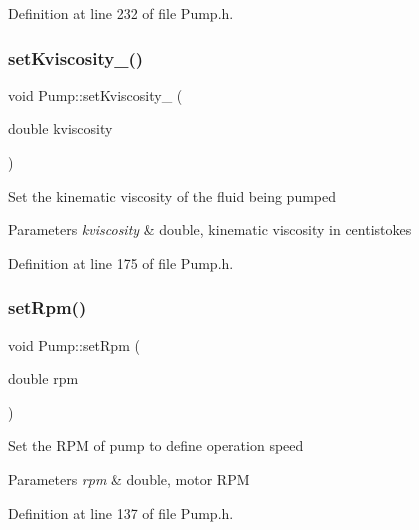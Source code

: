 Definition at line 232 of file Pump.\+h.

\mbox{\label{class_pump_a26d1d10908f91137f5148540ceb6520a}} 
\subsubsection{\texorpdfstring{set\+Kviscosity\+\_\+()}{setKviscosity\_()}}
{\footnotesize\ttfamily void Pump\+::set\+Kviscosity\+\_\+ (\begin{DoxyParamCaption}\item[{double}]{kviscosity }\end{DoxyParamCaption})\hspace{0.3cm}{\ttfamily [inline]}}

Set the kinematic viscosity of the fluid being pumped


\begin{DoxyParams}{Parameters}
{\em kviscosity} & double, kinematic viscosity in centistokes \\
\hline
\end{DoxyParams}


Definition at line 175 of file Pump.\+h.

\mbox{\label{class_pump_a7478d85c3b89cda275b039673603a785}} 
\subsubsection{\texorpdfstring{set\+Rpm()}{setRpm()}}
{\footnotesize\ttfamily void Pump\+::set\+Rpm (\begin{DoxyParamCaption}\item[{double}]{rpm }\end{DoxyParamCaption})\hspace{0.3cm}{\ttfamily [inline]}}

Set the R\+PM of pump to define operation speed


\begin{DoxyParams}{Parameters}
{\em rpm} & double, motor R\+PM \\
\hline
\end{DoxyParams}


Definition at line 137 of file Pump.\+h.

\mbox{\label{class_pump_a9b9773b74e0e56acece38107ab547728}} 
